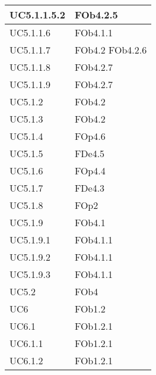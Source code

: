 \begin{longtable}{|l|p{4cm}|}
\hline
		UC5.1.1.5.2 & FOb4.2.5 \linebreak   \\
\hline
		UC5.1.1.6 & FOb4.1.1 \linebreak   \\
\hline
		UC5.1.1.7 & FOb4.2 \linebreak  FOb4.2.6 \linebreak   \\
\hline
		UC5.1.1.8 & FOb4.2.7 \linebreak   \\
\hline
		UC5.1.1.9 & FOb4.2.7 \linebreak   \\
\hline
		UC5.1.2 & FOb4.2 \linebreak   \\
\hline
		UC5.1.3 & FOb4.2 \linebreak   \\
\hline
		UC5.1.4 & FOp4.6 \linebreak   \\
\hline
		UC5.1.5 & FDe4.5 \linebreak   \\
\hline
		UC5.1.6 & FOp4.4 \linebreak   \\
\hline
		UC5.1.7 & FDe4.3 \linebreak   \\
\hline
		UC5.1.8 & FOp2 \linebreak   \\
\hline
		UC5.1.9 & FOb4.1 \linebreak   \\
\hline
		UC5.1.9.1 & FOb4.1.1 \linebreak   \\
\hline
		UC5.1.9.2 & FOb4.1.1 \linebreak   \\
\hline
		UC5.1.9.3 & FOb4.1.1 \linebreak   \\
\hline
		UC5.2 & FOb4 \linebreak   \\
\hline
		UC6 & FOb1.2 \linebreak   \\
\hline
		UC6.1 & FOb1.2.1 \linebreak   \\
\hline
		UC6.1.1 & FOb1.2.1 \linebreak   \\
\hline
		UC6.1.2 & FOb1.2.1 \linebreak   \\

\end{longtable}
